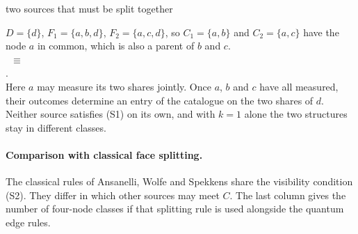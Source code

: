 \begin{validbox}[label=ex:together]{two sources that must be split together}
\begin{minipage}{0.5\linewidth}
$D=\{d\}$, $F_1=\{a,b,d\}$, $F_2=\{a,c,d\}$, so $C_1=\{a,b\}$ and $C_2=\{a,c\}$ have the node $a$ in common, which
is also a parent of $b$ and $c$.\\[3pt]
 \ $\equiv$\\
.\\[3pt]
Here $a$ may measure its two shares jointly. Once $a$, $b$ and $c$ have all measured, their outcomes determine
an entry of the catalogue on the two shares of $d$. Neither source satisfies (S1) on its own, and
with $k=1$ alone the two structures stay in different classes.
\end{minipage}\hfill
\begin{minipage}{0.47\linewidth}\centering
{}
\end{minipage}
\end{validbox}

\paragraph{Comparison with classical face splitting.}
The classical rules of Ansanelli, Wolfe and Spekkens \cite{AWS} share the visibility condition (S2).
They differ in which other sources may meet $C$. The last column gives the number of four-node classes
if that splitting rule is used alongside the quantum edge rules.

